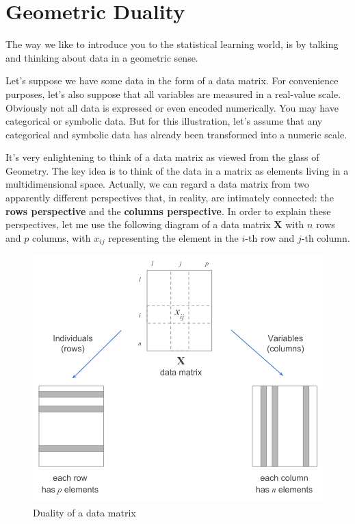 \documentclass[]{book}
\begin{document}
\hypertarget{duality}{%
\chapter{Geometric Duality}\label{duality}}

The way we like to introduce you to the statistical learning world, is by
talking and thinking about data in a geometric sense.

Let's suppose we have some data in the form of a data matrix. For convenience
purposes, let's also suppose that all variables are measured in a real-value scale.
Obviously not all data is expressed or even encoded numerically. You may have
categorical or symbolic data. But for this illustration, let's assume that any
categorical and symbolic data has already been transformed into a numeric scale.

It's very enlightening to think of a data matrix as viewed from the glass of
Geometry. The key idea is to think of the data in a matrix as elements living
in a multidimensional space. Actually, we can regard a data matrix from two
apparently different perspectives that, in reality, are intimately connected:
the \textbf{rows perspective} and the \textbf{columns perspective}. In order to explain
these perspectives, let me use the following diagram of a data matrix \(\mathbf{X}\)
with \(n\) rows and \(p\) columns, with \(x_{ij}\) representing the element in the \(i\)-th
row and \(j\)-th column.

\begin{figure}

{\centering \includegraphics[width=0.7\linewidth]{images/duality/data-perspectives} 

}

\caption{Duality of a data matrix}\label{fig:unnamed-chunk-7}
\end{figure}
\end{document}
